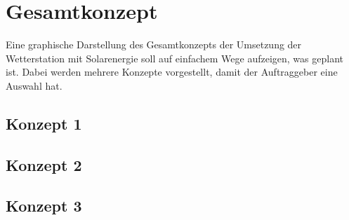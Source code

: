 \section{Gesamtkonzept}
Eine graphische Darstellung des Gesamtkonzepts der Umsetzung der Wetterstation mit Solarenergie soll auf einfachem Wege aufzeigen, was geplant ist. Dabei werden mehrere Konzepte vorgestellt, damit der Auftraggeber eine Auswahl hat.\\
\subsection{Konzept 1}
\subsection{Konzept 2}
\subsection{Konzept 3}